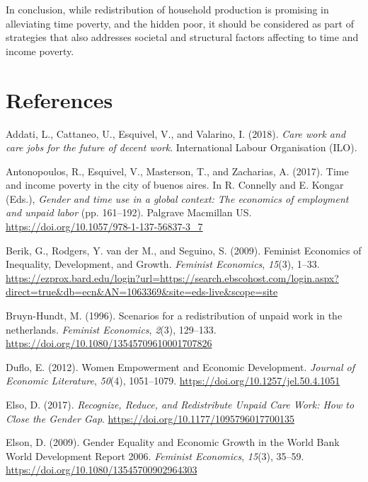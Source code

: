 \documentclass[
  11pt,
]{article}
\newlength{\cslhangindent}
\newenvironment{CSLReferences}[2] %
 {\begin{list}{}{%
  \setlength{\itemindent}{0pt}
  \setlength{\leftmargin}{0pt}
  \setlength{\parsep}{0pt}
  \ifodd #1
   \setlength{\leftmargin}{\cslhangindent}
   \setlength{\itemindent}{-1\cslhangindent}
  \fi
  \setlength{\itemsep}{#2\baselineskip}}}
 {\end{list}}
\begin{document}
In conclusion, while redistribution of household production is promising
in alleviating time poverty, and the hidden poor, it should be
considered as part of strategies that also addresses societal and
structural factors affecting to time and income poverty.

\section*{References}\label{references}

\label{refs}
\begin{CSLReferences}{1}{0}
Addati, L., Cattaneo, U., Esquivel, V., and Valarino, I. (2018).
\emph{Care work and care jobs for the future of decent work}.
International Labour Organisation (ILO).

Antonopoulos, R., Esquivel, V., Masterson, T., and Zacharias, A. (2017).
Time and income poverty in the city of buenos aires. In R. Connelly and
E. Kongar (Eds.), \emph{Gender and time use in a global context: The
economics of employment and unpaid labor} (pp. 161--192). Palgrave
Macmillan US. \url{https://doi.org/10.1057/978-1-137-56837-3_7}

Berik, G., Rodgers, Y. van der M., and Seguino, S. (2009). Feminist
{Economics} of {Inequality}, {Development}, and {Growth}. \emph{Feminist
Economics}, \emph{15}(3), 1--33.
\url{https://ezprox.bard.edu/login?url=https://search.ebscohost.com/login.aspx?direct=true&db=ecn&AN=1063369&site=eds-live&scope=site}

Bruyn-Hundt, M. (1996). Scenarios for a redistribution of unpaid work in
the netherlands. \emph{Feminist Economics}, \emph{2}(3), 129--133.
\url{https://doi.org/10.1080/13545709610001707826}

Duflo, E. (2012). Women {Empowerment} and {Economic} {Development}.
\emph{Journal of Economic Literature}, \emph{50}(4), 1051--1079.
\url{https://doi.org/10.1257/jel.50.4.1051}

Elso, D. (2017). \emph{Recognize, {Reduce}, and {Redistribute} {Unpaid}
{Care} {Work}: {How} to {Close} the {Gender} {Gap}}.
\url{https://doi.org/10.1177/1095796017700135}

Elson, D. (2009). Gender {Equality} and {Economic} {Growth} in the
{World} {Bank} {World} {Development} {Report} 2006. \emph{Feminist
Economics}, \emph{15}(3), 35--59.
\url{https://doi.org/10.1080/13545700902964303}


\end{CSLReferences}
\end{document}

